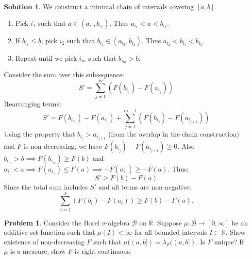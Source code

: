 \documentclass{article}
\theoremstyle{definition}
\newtheorem{problem}{Problem}
\newtheorem*{solution}{Solution}
\begin{document}
\begin{solution}
We construct a minimal chain of intervals covering $[a, b]$.
\begin{enumerate}
    \item Pick $i_1$ such that $a \in (a_{i_1}, b_{i_1})$. Thus $a_{i_1} < a < b_{i_1}$.
    \item If $b_{i_1} \le b$, pick $i_2$ such that $b_{i_1} \in (a_{i_2}, b_{i_2})$. Thus $a_{i_2} < b_{i_1} < b_{i_2}$.
    \item Repeat until we pick $i_m$ such that $b_{i_m} > b$.
\end{enumerate}
Consider the sum over this subsequence:
\[ S' = \sum_{j=1}^m (F(b_{i_j}) - F(a_{i_j})) \]
Rearranging terms:
\[ S' = F(b_{i_m}) - F(a_{i_1}) + \sum_{j=1}^{m-1} (F(b_{i_j}) - F(a_{i_{j+1}})) \]
Using the property that $b_{i_j} > a_{i_{j+1}}$ (from the overlap in the chain construction) and $F$ is non-decreasing, we have $F(b_{i_j}) - F(a_{i_{j+1}}) \ge 0$.
Also $b_{i_m} > b \implies F(b_{i_m}) \ge F(b)$ and $a_{i_1} < a \implies F(a_{i_1}) \le F(a) \implies -F(a_{i_1}) \ge -F(a)$.
Thus:
\[ S' \ge F(b) - F(a) \]
Since the total sum includes $S'$ and all terms are non-negative:
\[ \sum_{i=1}^k (F(b_i) - F(a_i)) \ge F(b) - F(a). \]
\end{solution}

\hrulefill

\begin{problem}
Consider the Borel $\sigma$-algebra $\mathcal{B}$ on $\mathbb{R}$. Suppose $\mu: \mathcal{B} \to [0, \infty]$ be an additive set function such that $\mu(I) < \infty$ for all bounded intervals $I \subset \mathbb{R}$. Show existence of non-decreasing $F$ such that $\mu((a, b]) = \lambda_F((a, b])$. Is $F$ unique? If $\mu$ is a measure, show $F$ is right continuous.
\end{problem}
\end{document}
